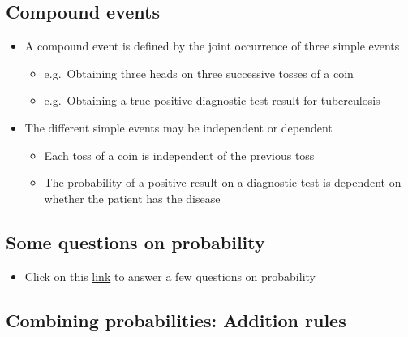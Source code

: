 \documentclass[
]{book}
\providecommand{\tightlist}{%
  \setlength{\itemsep}{0pt}\setlength{\parskip}{0pt}}
\begin{document}
\hypertarget{compound-events}{%
\subsection{Compound events}\label{compound-events}}

\begin{itemize}
\tightlist
\item
  A compound event is defined by the joint occurrence of three simple events

  \begin{itemize}
  \tightlist
  \item
    e.g.~Obtaining three heads on three successive tosses of a coin
  \item
    e.g.~Obtaining a true positive diagnostic test result for tuberculosis
  \end{itemize}
\item
  The different simple events may be independent or dependent

  \begin{itemize}
  \tightlist
  \item
    Each toss of a coin is independent of the previous toss
  \item
    The probability of a positive result on a diagnostic test is dependent on whether the patient has the disease
  \end{itemize}
\end{itemize}

\hypertarget{some-questions-on-probability}{%
\subsection{Some questions on probability}\label{some-questions-on-probability}}

\begin{itemize}
\tightlist
\item
  Click on this \href{https://forms.office.com/Pages/ResponsePage.aspx?id=cZYxzedSaEqvqfz4-J8J6vtaSwoU68FCgvKfzwN_XcBUQTRINzBERUowMVJVRjVTVzVXNzdFUUY1Ti4u}{link} to answer a few questions on probability
\end{itemize}

\hypertarget{combining-probabilities-addition-rules}{%
\subsection{Combining probabilities: Addition rules}\label{combining-probabilities-addition-rules}}
\end{document}
